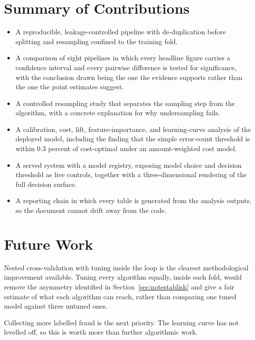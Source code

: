 \section{Summary of Contributions}

\begin{itemize}
  \item A reproducible, leakage-controlled pipeline with de-duplication before splitting and
        resampling confined to the training fold.
  \item A comparison of eight pipelines in which every headline figure carries a confidence
        interval and every pairwise difference is tested for significance, with the
        conclusion drawn being the one the evidence supports rather than the one the point
        estimates suggest.
  \item A controlled resampling study that separates the sampling step from the algorithm,
        with a concrete explanation for why undersampling fails.
  \item A calibration, cost, lift, feature-importance, and learning-curve analysis of the
        deployed model, including the finding that the simple error-count threshold is
        within 0.3 percent of cost-optimal under an amount-weighted cost model.
  \item A served system with a model registry, exposing model choice and decision threshold
        as live controls, together with a three-dimensional rendering of the full decision
        surface.
  \item A reporting chain in which every table is generated from the analysis outputs, so
        the document cannot drift away from the code.
\end{itemize}

\section{Future Work}

Nested cross-validation with tuning inside the loop is the clearest methodological
improvement available. Tuning every algorithm equally, inside each fold,
would remove the asymmetry identified in Section~\ref{sec:notestablish} and give a fair
estimate of what each algorithm can reach, rather than comparing one tuned model against
three untuned ones.

Collecting more labelled fraud is the next priority. The learning curve has not levelled
off, so this is worth more than further algorithmic work.

